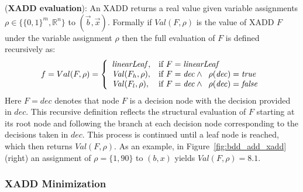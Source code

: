 \documentclass[twoside,11pt]{article}
\newenvironment{mydef}[1][Definition]{\begin{trivlist}
\item[\hskip \labelsep {\bfseries #1}]}{\end{trivlist}}
\begin{document}
\begin{mydef}(\textbf{XADD evaluation}):
An XADD returns a real value given variable assignments $\rho \in \lbrace \lbrace0,1 \rbrace^m,\mathbb{R}^n \rbrace$ to $(\vec{b},\vec{x})$. Formally if $ Val(F,\rho)$ is the value of  XADD $F$ under the variable assignment $\rho$ then the full evaluation of $F$ is defined recursively as:
\begin{equation*}
f = Val(F,\rho) = \left\{
\begin{array}{lll}
\mathit{linearLeaf},  &\textrm{if } F=\mathit{linearLeaf}\\
\mathit{Val} (F_h,\rho), &\textrm{if } F = \mathit{dec} \wedge \hspace{2mm} \rho(\mathit{dec})=\mathit{true}\\
 \mathit{Val} (F_l,\rho), &\textrm{if } F = \mathit{dec} \wedge  \hspace{2mm} \rho(\mathit{dec})=\mathit{false}\\
\end{array} \right. 
\end{equation*}
Here $F=\mathit{dec}$ denotes that node $F$ is a decision node with the decision provided in $\mathit{dec}$.
This recursive definition reflects the structural
evaluation of $F$ starting at its root node and following
the branch at each decision node corresponding to the decisions taken
in $\mathit{dec}$. This process is continued until a leaf node is reached,
which then returns $Val(F,\rho)$. As an example, in Figure~\ref{fig:bdd_add_xadd} (right) an assignment of $\rho = \lbrace 1, 90\rbrace$ to $(b,x)$ yields $Val(F,\rho)=8.1$.
\end{mydef}

\subsubsection{XADD Minimization}
\end{document}
